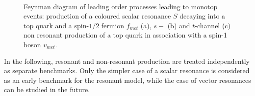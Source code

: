 \begin{figure}[!h!tpd]
\centering
{}\textwidth
{}\\\vspace{\baselineskip}
\caption
{
Feynman diagram of leading order processes leading to monotop events: production of
a coloured scalar resonance $S$ decaying into a top quark and a spin-$1/2$ fermion $f_{met}$ (a),
$s-$ (b) and $t$-channel (c) non resonant production of a top quark in association with
a spin-1 boson $v_{met}$.
}
\label{fig:feyn_prod}
\end{figure}

In the following, resonant and non-resonant production are treated independently as separate benchmarks. 
Only the simpler case of a scalar resonance is considered as an early benchmark for the resonant model, while the case of vector 
resonances can be studied in the future. 

